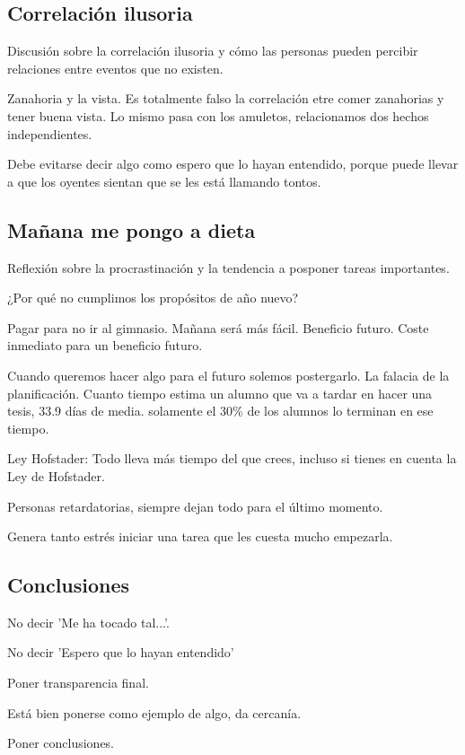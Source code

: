 \documentclass[12pt, a4paper, twoside]{article}
\begin{document}
\subsection{Correlación ilusoria}
Discusión sobre la correlación ilusoria y cómo las personas pueden percibir relaciones entre eventos que no existen.

Zanahoria y la vista. Es totalmente falso la correlación etre comer zanahorias y tener buena vista. Lo mismo pasa con los 
amuletos, relacionamos dos hechos independientes.

Debe evitarse decir algo como espero que lo hayan entendido, porque puede llevar a que los oyentes sientan que se les está llamando tontos.


\subsection{Mañana me pongo a dieta}
Reflexión sobre la procrastinación y la tendencia a posponer tareas importantes.

¿Por qué no cumplimos los propósitos de año nuevo?

Pagar para no ir al gimnasio. Mañana será más fácil. Beneficio futuro. 
Coste inmediato para un beneficio futuro.

Cuando queremos hacer algo para el futuro solemos postergarlo. La falacia de la planificación. 
Cuanto tiempo estima un alumno que va a tardar en hacer una tesis, 33.9 días de media. solamente el 30\%
de los alumnos lo terminan en ese tiempo.

Ley Hofstader: Todo lleva más tiempo del que crees, incluso si tienes en cuenta la Ley de Hofstader.

Personas retardatorias, siempre dejan todo para el último momento.

Genera tanto estrés iniciar una tarea que les cuesta mucho empezarla.

\subsection{Conclusiones}

No decir 'Me ha tocado tal...'.


No decir 'Espero que lo hayan entendido'

Poner transparencia final.

Está bien ponerse como ejemplo de algo, da cercanía.

Poner conclusiones.

\newpage
\end{document}
